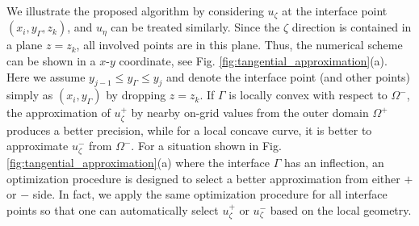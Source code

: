 \documentclass[dissertation]{uathesis}
\begin{document}
\begin{body}
\begin{flushleft}
\hspace{1cm} We illustrate the proposed algorithm by considering $u_{\zeta}$ at the interface point $(x_i,y_{\Gamma},z_k)$, and $u_{\eta}$ can be treated similarly. Since the $\zeta$ direction is contained in a plane $z=z_{k}$, all involved points are in this plane. Thus, the numerical scheme  can be shown in a $x$-$y$ coordinate, see Fig. \ref{fig:tangential_approximation}(a).
Here  we assume $y_{j-1} \le y_{\Gamma} \le y_{j}$ and denote the interface point (and other points) simply as $(x_i,y_{\Gamma})$ by dropping $z=z_k$. 
If $\Gamma$ is locally convex with respect to $\Omega^-$, the approximation of $u^{+}_{\zeta}$ by nearby on-grid values from the outer domain $\Omega^+$ produces a better precision, while for a local concave curve, it is better to approximate $u^{-}_{\zeta}$ from  $\Omega^-$. For a situation shown in Fig. \ref{fig:tangential_approximation}(a) where the interface $\Gamma$ has an inflection, an optimization procedure is designed to select a better approximation from either $+$ or $-$ side. In fact, we apply the same optimization procedure for all interface points so that one can automatically select $u^{+}_{\zeta}$ or $u^{-}_{\zeta}$ based on the local geometry. 


\end{flushleft}
\end{body}
\end{document}
